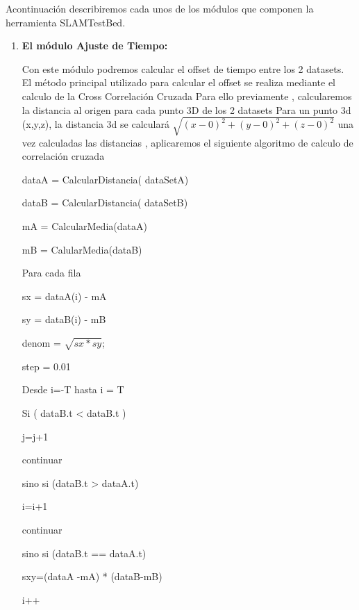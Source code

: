 Acontinuación describiremos cada unos de los módulos que componen la herramienta SLAMTestBed.
\begin{enumerate}%


\item \textbf{El módulo Ajuste de Tiempo:}

	Con este módulo podremos calcular el offset de tiempo entre los 2 datasets.
	El método principal utilizado para calcular el offset se realiza mediante el calculo de la Cross Correlación Cruzada
	Para ello previamente , calcularemos la distancia al origen para cada punto 3D de los 2 datasets
	Para un punto 3d (x,y,z), la distancia 3d se calculará 
	\begin{math}
	\sqrt{(x-0)^2 +(y-0)^2+(z-0)^2}
	\end{math}
	una vez calculadas las distancias , aplicaremos el siguiente algoritmo de calculo de correlación cruzada
	                                
	
									   dataA = CalcularDistancia( dataSetA)

									   dataB = CalcularDistancia( dataSetB)

									   mA = CalcularMedia(dataA)

									   mB = CalularMedia(dataB)

									   Para cada fila

									   		sx = dataA(i) - mA

									   		sy = dataB(i) - mB

								       denom = \begin{math}\sqrt{sx*sy}\end{math};

									   step = 0.01		

								       Desde i=-T hasta i = T

								            Si ( dataB.t < dataB.t )

								            	j=j+1

								            	continuar

								            sino si (dataB.t > dataA.t)

								            	i=i+1

								            	continuar

								            	sino si (dataB.t == dataA.t)

								            		sxy=(dataA -mA) * (dataB-mB)

								            		i++


\end{enumerate}
